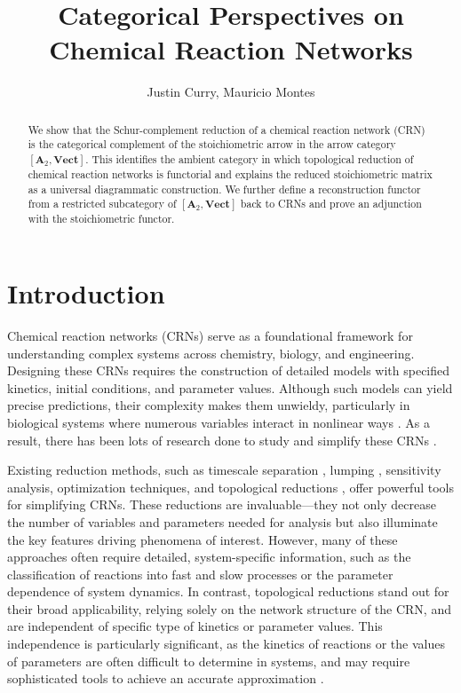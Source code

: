 \documentclass[11pt, one side, article]{memoir}
\title{Categorical Perspectives on Chemical Reaction Networks}
\author{Justin Curry, Mauricio Montes}
\date{}
\begin{document}
\maketitle

\begin{abstract}
    We show that the Schur-complement reduction of \cite{Hirono2021} a chemical reaction network (CRN) is the categorical complement of the stoichiometric arrow in the arrow category $[\mathbf{A}_2,\mathbf{Vect}]$. This identifies the ambient category in which topological reduction of chemical reaction networks is functorial and explains the reduced stoichiometric matrix as a universal diagrammatic construction. We further define a reconstruction functor from a restricted subcategory of $[\mathbf{A}_2, \mathbf{Vect}]$ back to CRNs and prove an adjunction with the stoichiometric functor. 
\end{abstract}

\chapter{Introduction}
\label{sec:intro}

Chemical reaction networks (CRNs) serve as a foundational framework for understanding complex systems across chemistry, biology, and engineering. Designing these CRNs requires the construction of detailed models with specified kinetics, initial conditions, and parameter values. Although such models can yield precise predictions, their complexity makes them unwieldy, particularly in biological systems where numerous variables interact in nonlinear ways \cite{Konieczny2023, Tanner2018-hj, FEINBERG1974775, FEINBERG198059}. As a result, there has been lots of research done to study and simplify these CRNs \cite{hycosbm, jost2018hypergraph, PhysRevX.13.021040, MorphismsReaction, FEINBERG19891819}.

Existing reduction methods, such as timescale separation \cite{10.1214/12-AAP841}, lumping \cite{Wei1969, Kuo1969}, sensitivity analysis, optimization techniques, and topological reductions \cite{Hirono2021, rao2012graphtheoreticalapproachanalysismodel}, offer powerful tools for simplifying CRNs. These reductions are invaluable—they not only decrease the number of variables and parameters needed for analysis but also illuminate the key features driving phenomena of interest. However, many of these approaches often require detailed, system-specific information, such as the classification of reactions into fast and slow processes or the parameter dependence of system dynamics. In contrast, topological reductions stand out for their broad applicability, relying solely on the network structure of the CRN, and are independent of specific type of kinetics or parameter values. This independence is particularly significant, as the kinetics of reactions or the values of parameters are often difficult to determine in systems, and may require sophisticated tools to achieve an accurate approximation \cite{doi:10.1021/acs.jpcb.3c03649}.
\end{document}
